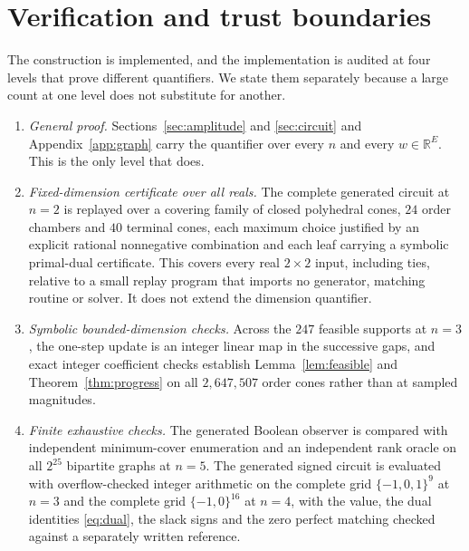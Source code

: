 \documentclass[11pt]{article}
\begin{document}
\section{Verification and trust boundaries}
\label{sec:verification}

The construction is implemented, and the implementation is audited at four
levels that prove different quantifiers.  We state them separately because a
large count at one level does not substitute for another.

\begin{enumerate}
  \item \emph{General proof.}  Sections~\ref{sec:amplitude} and
        \ref{sec:circuit} and Appendix~\ref{app:graph} carry
        the quantifier over every $n$ and every $w\in\mathbb R^{E}$.  This is the
        only level that does.
  \item \emph{Fixed-dimension certificate over all reals.}  The complete
        generated circuit at $n=2$ is replayed over a covering family of closed
        polyhedral cones, $24$ order chambers and $40$ terminal cones, each
        maximum choice justified by an explicit rational nonnegative combination
        and each leaf carrying a symbolic primal-dual certificate.  This covers
        every real $2\times2$ input, including ties, relative to a small replay
        program that imports no generator, matching routine or solver.  It does
        not extend the dimension quantifier.
  \item \emph{Symbolic bounded-dimension checks.}  Across the $247$ feasible
        supports at $n=3$, the one-step update is an integer linear map in the
        successive gaps, and exact integer coefficient checks establish
        Lemma~\ref{lem:feasible} and Theorem~\ref{thm:progress} on all
        $2{,}647{,}507$ order cones rather than at sampled magnitudes.
  \item \emph{Finite exhaustive checks.}  The generated Boolean observer is
        compared with independent minimum-cover enumeration and an independent
        rank oracle on all $2^{25}$ bipartite graphs at $n=5$.  The generated
        signed circuit is evaluated with overflow-checked integer arithmetic on
        the complete grid $\{-1,0,1\}^{9}$ at $n=3$ and the complete grid
        $\{-1,0\}^{16}$ at $n=4$, with the value, the dual identities
        \eqref{eq:dual}, the slack signs and the zero perfect matching checked
        against a separately written reference.
\end{enumerate}
\end{document}
